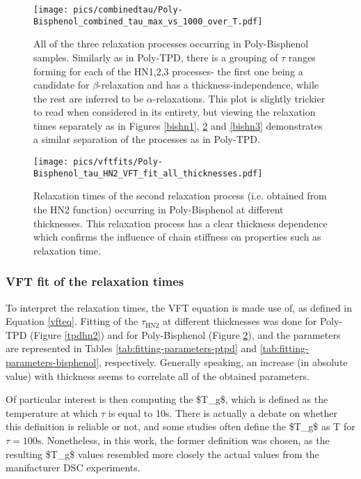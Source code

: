 \begin{figure}[t]%
  \centering
  \texttt{[image: pics/combinedtau/Poly-Bisphenol\_combined\_tau\_max\_vs\_1000\_over\_T.pdf]}
  \caption{All of the three relaxation processes occurring in Poly-Bisphenol samples. Similarly as in Poly-TPD, there is a grouping of $\tau$ ranges forming for each of the HN1,2,3 processes- the first one being a candidate for $\beta$-relaxation and has a thickness-independence, while the rest are inferred to be $\alpha$-relaxations. This plot is slightly trickier to read when considered in its entirety, but viewing the relaxation times separately as in Figures \ref{bishn1}, \ref{bishn2} and \ref{bishn3} demonstrates a similar separation of the processes as in Poly-TPD.}
  \label{alltaubis}
\end{figure}%



\begin{figure}[htp!]%
  \centering
  \texttt{[image: pics/vftfits/Poly-Bisphenol\_tau\_HN2\_VFT\_fit\_all\_thicknesses.pdf]}
  \caption{Relaxation times of the second relaxation process (i.e. obtained from the HN2 function) occurring in Poly-Bisphenol at different thicknesses. This relaxation process has a clear thickness dependence which confirms the influence of chain stiffness on properties such as relaxation time.}
  \label{bishn2}
\end{figure}%


\subsubsection{VFT fit of the relaxation times}
To interpret the relaxation times, the \ac{VFT} equation is made use of, as defined in Equation \ref{vfteq}. Fitting of the $\tau_{\text{HN2}}$ at different thicknesses was done for Poly-TPD (Figure \ref{tpdhn2}) and for Poly-Bisphenol (Figure \ref{bishn2}), and the parameters are represented in Tables \ref{tab:fitting-parameters-ptpd} and \ref{tab:fitting-parameters-bisphenol}, respectively.
Generally speaking, an increase (in absolute value) with thickness seems to correlate all of the obtained parameters.

Of particular interest is then computing the \ac{$T_g$}, which is defined as the temperature at which $\tau$ is equal to 10s.  There is actually a debate on whether this definition is reliable or not, and some studies \cite{gtt1} \cite{gtt2} often define the \ac{$T_g$} as T for $\tau = \text{100s}$. Nonetheless, in this work, the former definition was chosen, as the resulting \ac{$T_g$} values resembled more closely the actual values from the manifacturer \ac{DSC} experiments. %



